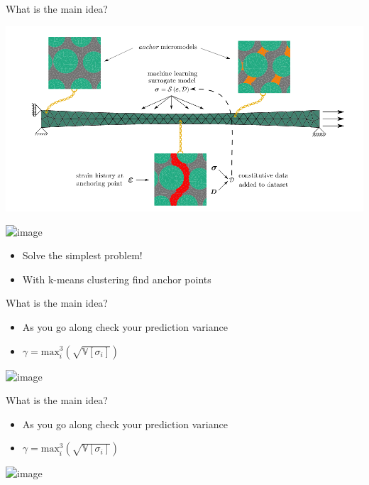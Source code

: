 \documentclass[aspectratio=169]{beamer}
\begin{document}
\begin{frame}{What is the main idea?}
  \begin{minipage}{0.5\textwidth}
    \includegraphics[width=1.1\textwidth]{Figures/anchor}
  \end{minipage}%
  \begin{minipage}{0.5\textwidth}
    \includegraphics<1>[width=1.1\textwidth]{Figures/heat}
    \begin{itemize}
      \item <1> Solve the simplest problem! 
      \item <1> With k-means clustering find anchor points
    \end{itemize}
  \end{minipage}
\end{frame}

\begin{frame}{What is the main idea?}
  \begin{minipage}{0.5\textwidth}
  \begin{itemize}
      \item <1> As you go along check your prediction variance
      \item <1>  $\gamma = \text{max}_i^3(\sqrt{\mathbb{V}[\sigma_i]})$
  \end{itemize}
  \end{minipage}%
  \begin{minipage}{0.5\textwidth}
    \includegraphics<1>[width=1.1\textwidth]{Figures/idea}
  \end{minipage}
\end{frame}

\begin{frame}{What is the main idea?}
  \begin{minipage}{0.5\textwidth}
  \begin{itemize}
      \item <1> As you go along check your prediction variance
      \item <1>  $\gamma = \text{max}_i^3(\sqrt{\mathbb{V}[\sigma_i]})$
  \end{itemize}
  \end{minipage}%
  \begin{minipage}{0.5\textwidth}
    \includegraphics<1>[width=1.1\textwidth]{Figures/observe}
  \end{minipage}
\end{frame}
\end{document}

